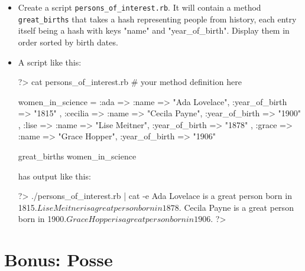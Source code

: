 \documentclass{42-en}
\begin{document}
\begin{itemize}

\item Create a script \texttt{persons\_of\_interest.rb}. It will contain a method \texttt{great\_births} that takes a hash representing people from history, each entry itself being a hash with keys "name" and "year\_of\_birth". Display them in order sorted by birth dates.

\item A script like this:
\begin{42console}
	?> cat persons_of_interest.rb
	# your method definition here

	women_in_science = {
		:ada => { :name => "Ada Lovelace", :year_of_birth => "1815" },
		:cecilia => { :name => "Cecila Payne", :year_of_birth => "1900" },
		:lise => { :name => "Lise Meitner", :year_of_birth => "1878" },
		:grace => { :name => "Grace Hopper", :year_of_birth => "1906" }
	}

	great_births women_in_science
\end{42console}

has output like this:
\begin{42console}
	?> ./persons_of_interest.rb | cat -e
	Ada Lovelace is a great person born in 1815.$
	Lise Meitner is a great person born in 1878.$
	Cecila Payne is a great person born in 1900.$
	Grace Hopper is a great person born in 1906.$
	?>
\end{42console}

\end{itemize}



\chapter{Bonus: Posse}

\exnumber{\exercicenumber}

\makeheaderfiles
\end{document}

